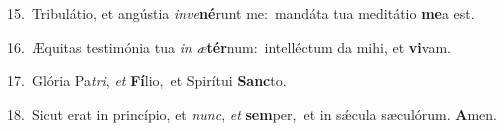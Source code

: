 {\numbfont\textcolor{\numbcolor}{15.}}~Tribulátio, et angústia \textit{in}\-\textit{ve}\textbf{né}runt me:~\star mandáta tua meditátio \textbf{me}\-a est.\par
{\numbfont\textcolor{\numbcolor}{16.}}~Æquitas testimónia tua \textit{in} \textit{æ}\-\textbf{tér}num:~\star intelléctum da mihi, et \textbf{vi}\-vam.\par
{\numbfont\textcolor{\numbcolor}{17.}}~Glória Pa\-\textit{tri}\-, \textit{et} \textbf{Fí}\-lio,~\star et Spirítui \textbf{Sanc}\-to.\par
{\numbfont\textcolor{\numbcolor}{18.}}~Sicut erat in princípio, et \textit{nunc}\-, \textit{et} \textbf{sem}\-per,~\star et in sǽcula sæculórum. \textbf{A}\-men.\par
